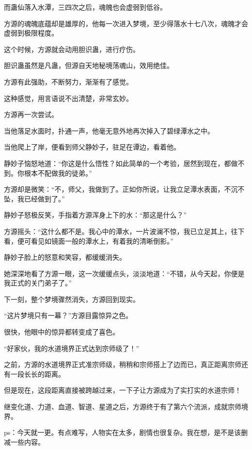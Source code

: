\begin{this_body}
而蛊仙落入水潭，三四次之后，魂魄也会虚弱到低谷。

方源的魂魄底蕴却是雄厚的，他每一次进入梦境，至少得落水十七八次，魂魄才会虚弱到极限程度。

这个时候，方源就会动用胆识蛊，进行疗伤。

胆识蛊虽然是凡蛊，但源自天地秘境荡魂山，效用绝佳。

方源有此强助，不断努力，渐渐有了感觉。

这种感觉，用言语说不出清楚，非常玄妙。

方源再一次尝试。

当他落足水面时，扑通一声，他毫无意外地再次掉入了碧绿潭水之中。

当他爬上了岸，便看到师父静妙子，驻足在谭边，看着他。

静妙子恼怒地道：“你这是什么悟性？如此简单的一个考验，居然到现在，都做不到。你根本不配做我的徒弟。”

方源却是微笑：“不，师父，我做到了。正如你所说，让我立足潭水表面，不沉不坠，我已经做到了。”

静妙子怒极反笑，手指着方源浑身上下的水：“那这是什么？”

方源摇头：“这什么都不是。我心中的潭水，一片波澜不惊，我已立足其上，往下看，便可看见如镜面一般的潭水上，有着我的清晰倒影。”

静妙子脸上的怒意和笑容，都缓缓消失。

她深深地看了方源一眼，这一次缓缓点头，淡淡地道：“不错，从今天起，你便是我正式的关门弟子了。”

下一刻，整个梦境骤然消失，方源回到现实。

“这片梦境只有一幕？”方源目露惊异之色。

很快，他眼中的惊异都转变成了喜色。

“好家伙，我的水道境界正式达到宗师级了！”

之前，方源的水道境界正式准宗师级，稍稍和宗师搭上了边而已，真正距离宗师还有一段长长的距离。

但是现在，这段距离直接被跨越过来，一下子让方源成为了实打实的水道宗师！

继变化道、力道、血道、智道、星道之后，方源终于有了第六个流派，成就宗师境界。

ps：今天就一更。有点难写，人物实在太多，剧情也很复杂。我在想，是不是该删减一些内容。

\end{this_body}


